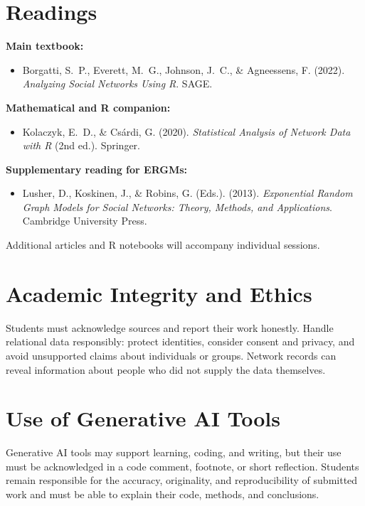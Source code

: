 \documentclass[a4paper,11pt]{article}
\begin{document}
\section*{Readings}
\textbf{Main textbook:}
\begin{itemize}
\item Borgatti, S.~P., Everett, M.~G., Johnson, J.~C., \& Agneessens, F. (2022). \textit{Analyzing Social Networks Using R}. SAGE.
\end{itemize}
\textbf{Mathematical and R companion:}
\begin{itemize}
\item Kolaczyk, E.~D., \& Cs\'{a}rdi, G. (2020). \textit{Statistical Analysis of Network Data with R} (2nd ed.). Springer.
\end{itemize}
\textbf{Supplementary reading for ERGMs:}
\begin{itemize}
\item Lusher, D., Koskinen, J., \& Robins, G. (Eds.). (2013). \textit{Exponential Random Graph Models for Social Networks: Theory, Methods, and Applications}. Cambridge University Press.
\end{itemize}
Additional articles and R notebooks will accompany individual sessions.

\section*{Academic Integrity and Ethics}
Students must acknowledge sources and report their work honestly. Handle relational data responsibly: protect identities, consider consent and privacy, and avoid unsupported claims about individuals or groups. Network records can reveal information about people who did not supply the data themselves.

\section*{Use of Generative AI Tools}
Generative AI tools may support learning, coding, and writing, but their use must be acknowledged in a code comment, footnote, or short reflection. Students remain responsible for the accuracy, originality, and reproducibility of submitted work and must be able to explain their code, methods, and conclusions.
\end{document}
